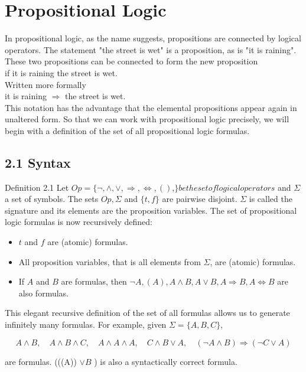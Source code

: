\documentclass[10pt]{article}
\begin{document}
\section*{Propositional Logic}
In propositional logic, as the name suggests, propositions are connected by logical operators. The statement "the street is wet" is a proposition, as is "it is raining". These two propositions can be connected to form the new proposition\\

if it is raining the street is wet.\\
Written more formally\\
it is raining $\Rightarrow$ the street is wet.\\
This notation has the advantage that the elemental propositions appear again in unaltered form. So that we can work with propositional logic precisely, we will begin with a definition of the set of all propositional logic formulas.

\subsection*{2.1 Syntax}
Definition 2.1 Let $O p=\{\neg, \wedge, \vee, \Rightarrow, \Leftrightarrow,()$,$\} be the set of logical operators$ and $\Sigma$ a set of symbols. The sets $O p, \Sigma$ and $\{t, f\}$ are pairwise disjoint. $\Sigma$ is called the signature and its elements are the proposition variables. The set of propositional logic formulas is now recursively defined:

\begin{itemize}
  \item $t$ and $f$ are (atomic) formulas.
  \item All proposition variables, that is all elements from $\Sigma$, are (atomic) formulas.
  \item If $A$ and $B$ are formulas, then $\neg A,(A), A \wedge B, A \vee B, A \Rightarrow B, A \Leftrightarrow B$ are also formulas.
\end{itemize}

This elegant recursive definition of the set of all formulas allows us to generate infinitely many formulas. For example, given $\Sigma=\{A, B, C\}$,

$$
A \wedge B, \quad A \wedge B \wedge C, \quad A \wedge A \wedge A, \quad C \wedge B \vee A, \quad(\neg A \wedge B) \Rightarrow(\neg C \vee A)
$$

are formulas. (((A)) $\vee B$ ) is also a syntactically correct formula.
\end{document}

